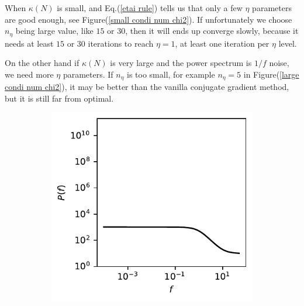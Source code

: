 \documentclass[11pt, letterpaper]{article}
\begin{document}
When $\kappa(N)$ is small, and Eq.(\ref{etai rule}) tells us that only a few
$\eta$ parameters are good enough, see Figure(\ref{small condi num chi2}).
If unfortunately we choose $n_{\eta}$ being large value, like $15$ or $30$,
then it will ends up converge slowly, because it needs at least $15$ or $30$
iterations to reach $\eta=1$, at least one iteration per $\eta$ level.

On the other hand if $\kappa(N)$ is very large and the power spectrum is $1/f$
noise, we need more $\eta$ parameters.
If $n_{\eta}$ is too small, for example $n_{\eta}=5$ in
Figure(\ref{large condi num chi2}), it may be better than the vanilla conjugate
gradient method, but it is still far from optimal.


\begin{figure}[htb]
\centering
\begin{subfigure}{0.33\textwidth}
    \centering
    \includegraphics[width=\linewidth]
        {./images/0.1/small_condition_num/P_f.pdf}
    \caption{}
    \label{small condi num power spectrum}
\end{subfigure}%
\begin{subfigure}{0.33\textwidth}
    \centering

\end{subfigure}
\end{figure}
\end{document}
